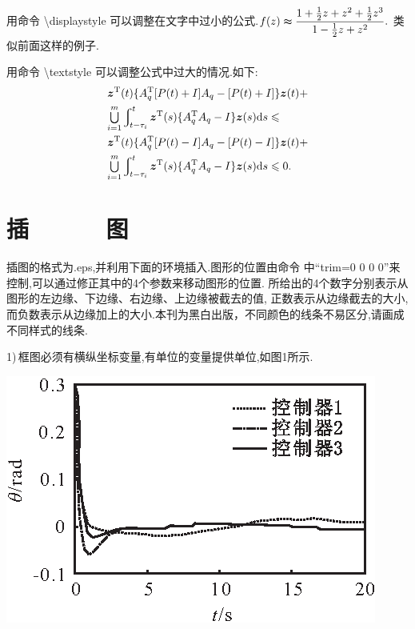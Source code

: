 \documentclass{ctacn}%
\begin{document}
\begin{multicols}{2}
用命令 \textbackslash displaystyle  可以调整在文字中过小的公式.\;$f(z)\thickapprox{\displaystyle\frac{1+\frac{1}{2}z+z^2+\frac{1}{2}z^3}{1-\frac{1}{2}z+z^2}}.$
类似前面这样的例子.

用命令 \textbackslash textstyle 可以调整公式中过大的情况.\;如下:
\begin{align}
&{\bm z}^{\rm T}(t)\{A_q^{\rm T}[P(t)+I]A_q-[P(t)+I]\}{\bm z}(t)+ \notag\\
&{\textstyle\bigcup\limits_{i=1}^m}\varint\nolimits_{t-\tau_i}^t{\bm
	z}^{\rm T}(s)\{A_q^{\rm T}A_q-I\}{\bm z}(s){\rm d}s\leqslant \notag\\
&{\bm z}^{\rm T}(t)\{A_q^{\rm T}[P(t)-I]A_q-[P(t)-I]\}{\bm z}(t)+ \notag\\
&{\textstyle\bigcup\limits_{i=1}^m}\varint\nolimits_{t-\tau_i}^t{\bm
	z}^{\rm T}(s)\{A_q^{\rm T}A_q-I\}{\bm z}(s){\rm d}s\leqslant 0.
\end{align}

\section{插~~~~~~图}

插图的格式为.eps,并利用下面的环境插入.图形的位置由命令
中“trim=0 0 0 0”来控制,可以通过修正其中的4个参数来移动图形的位置.
所给出的4个数字分别表示从图形的左边缘、下边缘、右边缘、上边缘被截去的值,
正数表示从边缘截去的大小, 而负数表示从边缘加上的大小.\;本刊为黑白出版，不同颜色的线条不易区分,请画成不同样式的线条.

1)\,框图必须有横纵坐标变量,有单位的变量提供单位,如图1所示.
\begin{center}
	\includegraphics[scale=1,trim=0 0 0 0]{template-1}\\
	\label{Fig1}
\end{center}


\end{multicols}
\end{document}
